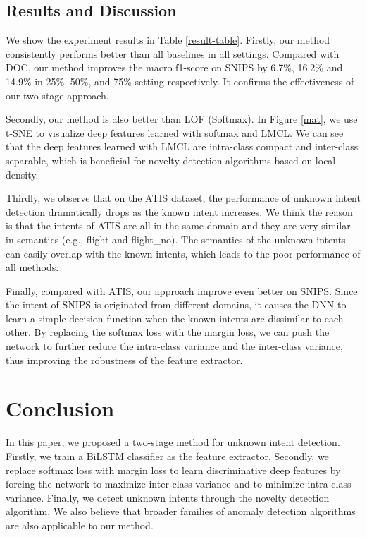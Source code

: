 \documentclass[11pt,a4paper]{article}
\begin{document}
 \subsection{Results and Discussion}
We show the experiment results in Table \ref{result-table}. Firstly, our method consistently performs better than all baselines in all settings. Compared with DOC, our method improves the macro f1-score on SNIPS by 6.7\%, 16.2\% and 14.9\% in 25\%, 50\%, and 75\% setting respectively. It confirms the effectiveness of our two-stage approach. 

Secondly, our method is also better than LOF (Softmax). In Figure \ref{mat}, we use t-SNE \cite{maaten2008visualizing} to visualize deep features learned with softmax and LMCL. We can see that the deep features learned with LMCL are intra-class compact and inter-class separable, which is beneficial for novelty detection algorithms based on local density.

Thirdly, we observe that on the ATIS dataset, the performance of unknown intent detection dramatically drops as the known intent increases. We think the reason is that the intents of ATIS are all in the same domain and they are very similar in semantics (e.g., flight and  flight\_no). The semantics of the unknown intents can easily overlap with the known intents, which leads to the poor performance of all methods.

Finally, compared with ATIS, our approach improve even better on SNIPS. Since the intent of SNIPS is originated from different domains, it causes the DNN to learn a simple decision function when the known intents are dissimilar to each other. By replacing the softmax loss with the margin loss, we can push the network to further reduce the intra-class variance and the inter-class variance, thus improving the robustness of the feature extractor.

\section{Conclusion}
In this paper, we proposed a two-stage method for unknown intent detection. Firstly, we train a BiLSTM classifier as the feature extractor. Secondly, we replace softmax loss with margin loss to learn discriminative deep features by forcing the network to maximize inter-class variance and to minimize intra-class variance. Finally, we detect unknown intents through the novelty detection algorithm. We also believe that broader families of anomaly detection algorithms are also applicable to our method. 
\end{document}
